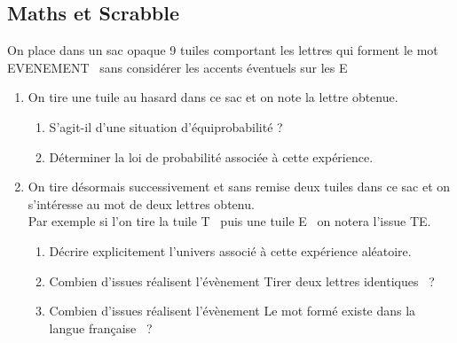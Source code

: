 \documentclass[oneside,12pt]{article}          %
\begin{document}
\subsection{Maths et Scrabble}
On place dans un sac opaque 9 tuiles comportant les lettres qui forment le mot \og EVENEMENT \fg \, sans considérer les accents éventuels sur les \og E \fg
\begin{enumerate}
	\item On tire une tuile au hasard dans ce sac et on note la lettre obtenue.
	\begin{enumerate}
		\item S'agit-il d'une situation d'équiprobabilité ?
		\item Déterminer la loi de probabilité associée à cette expérience.
	\end{enumerate}
	\item On tire désormais successivement et sans remise deux tuiles dans ce sac et on s'intéresse au mot de deux lettres obtenu.\\
	Par exemple si l'on tire la tuile \og T \fg \, puis une tuile \og E \fg \, on notera l'issue TE.
	\begin{enumerate}
		\item Décrire explicitement l'univers associé à cette expérience aléatoire.
		\item Combien d'issues réalisent l'évènement \og Tirer deux lettres identiques \fg \, ?
		\item Combien d'issues réalisent l'évènement \og Le mot formé existe dans la langue française \fg \, ?
	\end{enumerate}
\end{enumerate}
\end{document}
